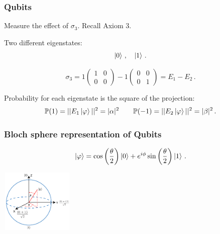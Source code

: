 \documentclass[12pt, aspectratio=169]{beamer}
\begin{document}
\begin{frame}
    \frametitle{Qubits}
    Measure the effect of $\sigma_3$. Recall Axiom 3. 

    Two different eigenstates:
    \begin{equation*}
        \ket{0} \,, \quad \ket{1} \,.
    \end{equation*}

    \begin{equation*}
        \sigma_3 = 1 \begin{pmatrix}
            1 & 0 \\  0 & 0
        \end{pmatrix} -1  \begin{pmatrix}
            0 & 0 \\  0 & 1
        \end{pmatrix} = E_1 - E_2 \,.
    \end{equation*}

    Probability for each eigenstate is the square of the projection:
    \begin{equation*}
        \mathbb{P}(1) = || E_1 \ket{\varphi}||^2 = |\alpha|^2 \qquad
        \mathbb{P}(-1) = || E_2 \ket{\varphi}||^2 = |\beta|^2 \,.
    \end{equation*}

\end{frame}


\begin{frame}
    \frametitle{Bloch sphere representation of Qubits}
    \begin{theorem}
        \begin{equation*}
            \ket{\varphi} = \cos \left( \frac{\theta}{2} \right)\ket{0} + e^{i\phi} \sin \left( \frac{\theta}{2}  \right) \ket{1} \,.
        \end{equation*}
    \end{theorem}

    \begin{center}
    \includegraphics[width=3.5cm, height=3cm]{intro/qubits.png}
    \end{center}

\end{frame}
\end{document}
